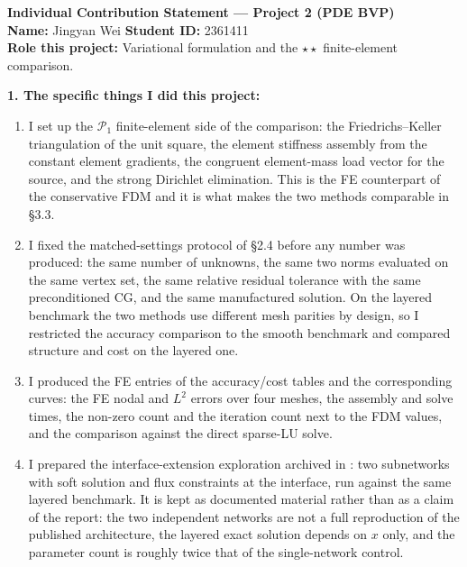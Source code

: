 \clearpage
\begin{formbox}
\small
\textbf{Individual Contribution Statement --- Project 2 (PDE BVP)}\\[0.3em]
\textbf{Name:} Jingyan Wei \hfill \textbf{Student ID:} 2361411\\
\textbf{Role this project:} Variational formulation and the
$\star\star$ finite-element comparison.

\textbf{1. The specific things I did this project:}
\begin{enumerate}[leftmargin=1.5em,itemsep=1pt,topsep=2pt]
    \item I set up the $\mathcal P_1$ finite-element side of the comparison:
    the Friedrichs--Keller triangulation of the unit square, the element
    stiffness assembly from the constant element gradients, the congruent
    element-mass load vector for the source, and the strong Dirichlet
    elimination. This is the FE counterpart of the conservative FDM and it is
    what makes the two methods comparable in \S3.3.
    \item I fixed the matched-settings protocol of \S2.4 before any number was
    produced: the same number of unknowns, the same two norms evaluated on the
    same vertex set, the same relative residual tolerance with the same
    preconditioned CG, and the same manufactured solution. On the layered
    benchmark the two methods use different mesh parities by design, so I
    restricted the accuracy comparison to the smooth benchmark and compared
    structure and cost on the layered one.
    \item I produced the FE entries of the accuracy/cost tables and the
    corresponding curves: the FE nodal and $L^2$ errors over four meshes, the
    assembly and solve times, the non-zero count and the iteration count next
    to the FDM values, and the comparison against the direct sparse-LU solve.
    \item I prepared the interface-extension exploration archived in
    : two subnetworks with soft solution and flux
    constraints at the interface, run against the same layered benchmark. It is
    kept as documented material rather than as a claim of the report: the two
    independent networks are not a full reproduction of the published
    architecture, the layered exact solution depends on $x$ only, and the
    parameter count is roughly twice that of the single-network control.
\end{enumerate}


\end{formbox}
